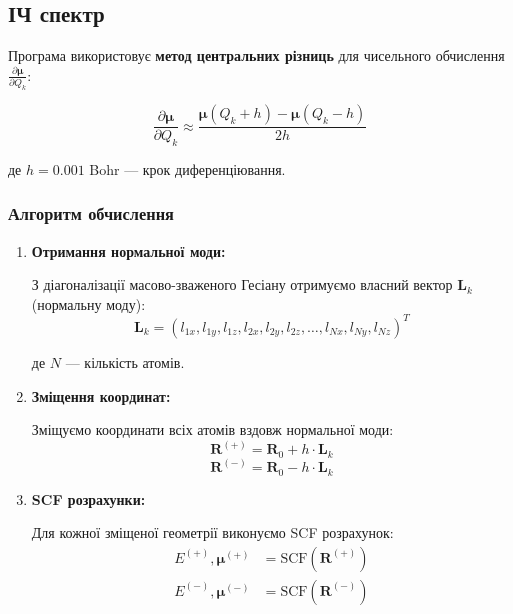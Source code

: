{%
\subsection{ІЧ спектр }

Програма використовує \textbf{метод центральних різниць} для чисельного обчислення $\frac{\partial \boldsymbol{\mu}}{\partial Q_k}$:

\begin{equation}
    \frac{\partial \boldsymbol{\mu}}{\partial Q_k} \approx \frac{\boldsymbol{\mu}(Q_k + h) - \boldsymbol{\mu}(Q_k - h)}{2h}
\end{equation}

де $h = 0.001$ Bohr --- крок диференціювання.

\subsubsection{Алгоритм обчислення}

\begin{enumerate}
    \item \textbf{Отримання нормальної моди:}

    З діагоналізації масово-зваженого Гесіану отримуємо власний вектор $\mathbf{L}_k$ (нормальну моду):
    \begin{equation}
        \mathbf{L}_k = (l_{1x}, l_{1y}, l_{1z}, l_{2x}, l_{2y}, l_{2z}, \ldots, l_{Nx}, l_{Ny}, l_{Nz})^T
    \end{equation}

    де $N$ --- кількість атомів.

    \item \textbf{Зміщення координат:}

    Зміщуємо координати всіх атомів вздовж нормальної моди:
    \begin{equation}
        \mathbf{R}^{(+)} = \mathbf{R}_0 + h \cdot \mathbf{L}_k
    \end{equation}
    \begin{equation}
        \mathbf{R}^{(-)} = \mathbf{R}_0 - h \cdot \mathbf{L}_k
    \end{equation}

    \item \textbf{SCF розрахунки:}

    Для кожної зміщеної геометрії виконуємо SCF розрахунок:
    \begin{align}
        E^{(+)}, \boldsymbol{\mu}^{(+)} &= \text{SCF}(\mathbf{R}^{(+)}) \\
        E^{(-)}, \boldsymbol{\mu}^{(-)} &= \text{SCF}(\mathbf{R}^{(-)})
    \end{align}


\end{enumerate}}
